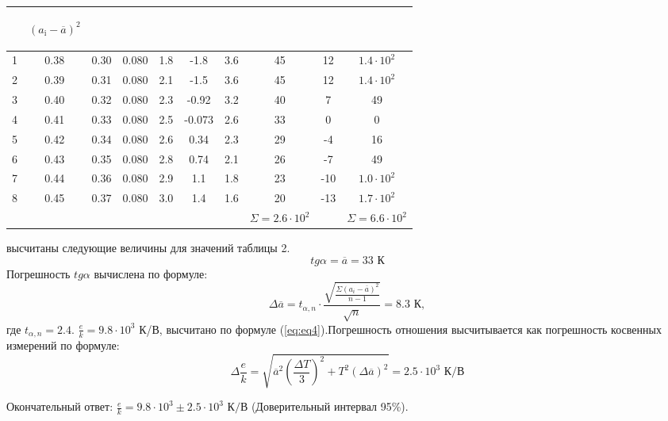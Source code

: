 \begin{center}
\begin{table}[H]
\begin{tabular}{|c|c|c|c|c|c|c|c|c|c|}
\begin{minipage}{21mm}
\end{minipage}&
\begin{minipage}{21mm}
     \begin{center} $(a_{\text{i}}-\overline{a})^2$ \end{center}
\end{minipage}\\
\hline
1 &  0.38  &  0.30  & 0.080 & 1.8& -1.8&3.6 & 45 &12 & $1.4\cdot 10^2$\\
2 &  0.39  &  0.31  &  0.080 & 2.1& -1.5&3.6 &45 &12 &$1.4\cdot 10^2$\\
3 &  0.40  &  0.32  & 0.080  & 2.3& -0.92&3.2 &40 &7 &49\\
4 & 0.41  &  0.33 &  0.080 & 2.5& -0.073&2.6  &33 &0 & 0\\
5 & 0.42  &  0.34  &  0.080 &  2.6&0.34 &2.3 &29 &-4 & 16 \\
6 & 0.43  &  0.35  &  0.080 & 2.8&0.74 &2.1 &26 &-7 & 49\\
7 & 0.44  &  0.36  &  0.080 & 2.9&1.1 &1.8 &23 &-10 & $1.0\cdot 10^2$ \\
8 & 0.45  &  0.37  &  0.080 & 3.0& 1.4 &1.6 &20 &-13 & $1.7\cdot 10^2$ \\
 &   &    &   & &  & & $\Sigma=2.6\cdot10^2$& & $\Sigma=6.6\cdot 10^2$ \\
\hline
\end{tabular}
\end{table}
\end{center}
 высчитаны следующие величины для значений таблицы 2.
\begin{equation}
    tg{\alpha}=\overline{a}=33 \text{ К}
\end{equation}
Погрешность $tg{\alpha}$ вычислена по формуле:
\begin{equation}
    \Delta\overline{a}=t_{\alpha,n}\cdot\frac{\sqrt{\frac{\Sigma(a_i-\overline{a})^2}{{n-1}}}}{\sqrt{n}}=8.3 \text{ К},
\end{equation}
где $t_{\alpha,n}=2.4$.
 $\frac{e}{k}=9.8\cdot10^3$ К/В, высчитано по формуле (\ref{eq:eq4}).Погрешность отношения высчитывается как погрешность косвенных измерений по формуле:
\begin{equation}
    \Delta\frac{e}{k}=\sqrt{\overline{a}^2(\frac{\Delta T}{3})^2+T^2(\Delta\overline{a})^2}=2.5\cdot10^3\text{ К/В}
\end{equation}
\par Окончательный ответ: $\frac{e}{k}=9.8\cdot10^3\pm2.5\cdot10^3\text{ К/В}$ (Доверительный интервал 95\%).
